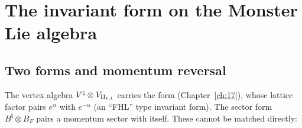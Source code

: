 \section{The invariant form on the Monster Lie algebra}\label{ch18:sec:form}

\subsection{Two forms and momentum reversal}

The vertex algebra ${V^{\natural}}\otimes V_{\mathrm{II}_{1,1}}$ carries the form 
(Chapter~\ref{ch:17}), whose lattice factor pairs $e^\alpha$ with $e^{-\alpha}$ (an ``FHL'' type invariant form).  The sector
form $B^\natural\otimes B_F$ pairs a momentum sector with itself.  These cannot be matched directly:

